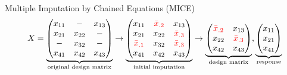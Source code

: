 \documentclass[aspectratio=43]{beamer}
\begin{document}
\begin{frame}{Multiple Imputation by Chained Equations (MICE)}
$$X = \underbrace{\begin{pmatrix}
x_{11} 	& - 		& x_{13} \\
x_{21} 	& x_{22} 	& - \\
- 		& x_{32} 	& - \\
x_{41} 	& x_{42} 	& x_{43} \\
\end{pmatrix}}_\text{original design matrix}
\rightarrow
\underbrace{\begin{pmatrix}
x_{11} 		& \textcolor{red}{\bar{x}_{.2}} 	& x_{13} \\
x_{21} 		& x_{22} 		& \textcolor{red}{\bar{x}_{.3}} \\
\textcolor{red}{\bar{x}_{.1}} & x_{32} 	& \textcolor{red}{\bar{x}_{.3}} \\
x_{41} 		& x_{42} 	& x_{43} \\
\end{pmatrix}}_\text{initial imputation}
\rightarrow
\underbrace{\begin{pmatrix}
\textcolor{red}{\bar{x}_{.2}} 	& x_{13} \\
x_{22} 		& \textcolor{red}{\bar{x}_{.3}} \\
x_{42} 	& x_{43} \\
\end{pmatrix}}_\text{design matrix},
\underbrace{\begin{pmatrix}
x_{11} \\
x_{21} \\
x_{41} \\
\end{pmatrix}}_\text{response}$$


\end{frame}
\end{document}
